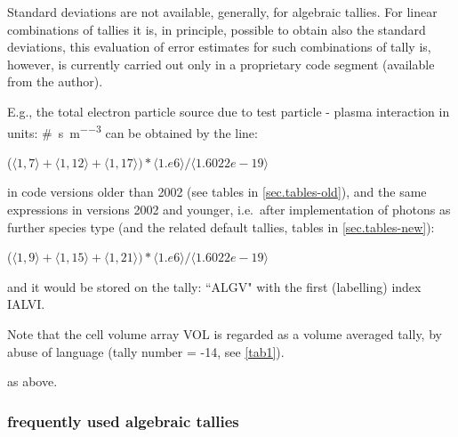 \begin{description}
        Standard deviations are not available, generally, for algebraic tallies.
        For linear combinations of tallies it is, in principle, possible to obtain also
        the standard deviations, this evaluation of error estimates for such
        combinations of tally is, however, is currently  carried out only in a
        proprietary code segment (available from the author).

        E.g., the total electron particle source due to test particle - plasma
        interaction in units: \si{\#\per\second\per\cubic\metre} can be obtained by the
        line:

        ($\langle 1,7\rangle +\langle 1,12\rangle +\langle 1,17\rangle) * \langle
          1.e6\rangle /\langle 1.6022e-19\rangle$ 

        in code versions older than 2002 (see tables in \cref{sec.tables-old}), and the
        same expressions in versions 2002 and younger, i.e.\ after implementation of
        photons as further species type (and the related default tallies, tables in
        \cref{sec.tables-new}):

        ($\langle 1,9\rangle+\langle 1,15\rangle+\langle 1,21\rangle) * \langle
          1.e6\rangle/\langle 1.6022e-19\rangle$ 

        and it would be stored on the tally: ``ALGV" with the first (labelling) index
        IALVI.

        Note that the cell volume array VOL is regarded as a volume averaged tally, by
        abuse of language (tally number = -14, see \cref{tab1}).
  \item[TXTTAL, TXTSPC, TXTUNT] as above.
\end{description}

\subsubsection{frequently used algebraic tallies}

